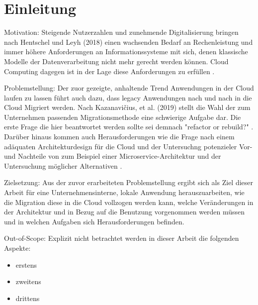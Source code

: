 
\chapter{Einleitung}


Motivation:
Steigende Nutzerzahlen und zunehmende Digitalisierung bringen nach Hentschel und Leyh (2018) einen wachsenden Bedarf an
Rechenleistung und immer höhere Anforderungen an Informationssysteme mit sich, denen klassische Modelle der Datenverarbeitung
nicht mehr gerecht werden können. Cloud Computing dagegen ist in der Lage diese Anforderungen zu erfüllen
\cite[Vgl.][S. 6]{Reinheimer2018}.

Problemstellung:
Der zuor gezeigte, anhaltende Trend Anwendungen in der Cloud laufen zu lassen führt auch dazu,
dass legacy Anwendungen nach und nach in die Cloud Migriert werden.
Nach Kazanavičius, et al. (2019) stellt die Wahl der zum Unternehmen passenden Migrationsmethode
eine schwierige Aufgabe dar. Die erste Frage die hier beantwortet werden sollte sei demnach
"refactor or rebuild?" \cite[Vgl.][S. 4]{Kazanavicius2019}.
Darüber hinaus kommen auch Herausforderungen wie die Frage nach einem adäquaten Architekturdesign
für die Cloud \cite[Vgl.][S. 14]{Pahl} und der Untersuchng potenzieler Vor- und Nachteile
von zum Beispiel einer Microservice-Architektur und der Untersuchung möglicher Alternativen
\cite[Vgl.][S. 3]{Carrasco2018}.

Zielsetzung:
Aus der zuvor erarbeiteten Problemstellung ergibt sich als Ziel dieser Arbeit für
eine Unternehmensinterne, lokale Anwendung herauszuarbeiten, wie die Migration diese in die
Cloud vollzogen werden kann, welche Veränderungen in der Architektur und in Bezug auf die Benutzung
vorgenommen werden müssen und in welchen Aufgaben sich Herausforderungen befinden.

Out-of-Scope:
Explizit nicht betrachtet werden in dieser Arbeit die folgenden Aspekte:
\begin{itemize}
\item erstens
\item zweitens
\item drittens
\end{itemize}

\pagebreak



